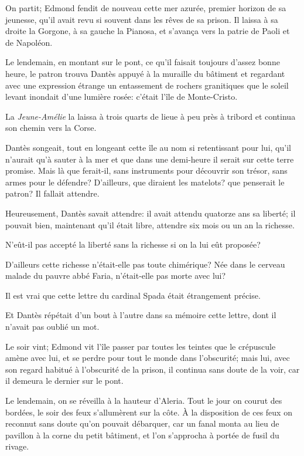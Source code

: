 On partit; Edmond fendit de nouveau cette mer azurée, premier horizon de sa jeunesse, qu'il avait revu si souvent dans les rêves de sa prison. Il laissa à sa droite la Gorgone, à sa gauche la Pianosa, et s'avança vers la patrie de Paoli et de Napoléon.

Le lendemain, en montant sur le pont, ce qu'il faisait toujours d'assez bonne heure, le patron trouva Dantès appuyé à la muraille du bâtiment et regardant avec une expression étrange un entassement de rochers granitiques que le soleil levant inondait d'une lumière rosée: c'était l'île de Monte-Cristo.

La \textit{Jeune-Amélie} la laissa à trois quarts de lieue à peu près à tribord et continua son chemin vers la Corse.

Dantès songeait, tout en longeant cette île au nom si retentissant pour lui, qu'il n'aurait qu'à sauter à la mer et que dans une demi-heure il serait sur cette terre promise. Mais là que ferait-il, sans instruments pour découvrir son trésor, sans armes pour le défendre? D'ailleurs, que diraient les matelots? que penserait le patron? Il fallait attendre.

Heureusement, Dantès savait attendre: il avait attendu quatorze ans sa liberté; il pouvait bien, maintenant qu'il était libre, attendre six mois ou un an la richesse.

N'eût-il pas accepté la liberté sans la richesse si on la lui eût proposée?

D'ailleurs cette richesse n'était-elle pas toute chimérique? Née dans le cerveau malade du pauvre abbé Faria, n'était-elle pas morte avec lui?

Il est vrai que cette lettre du cardinal Spada était étrangement précise.

Et Dantès répétait d'un bout à l'autre dans sa mémoire cette lettre, dont il n'avait pas oublié un mot.

Le soir vint; Edmond vit l'île passer par toutes les teintes que le crépuscule amène avec lui, et se perdre pour tout le monde dans l'obscurité; mais lui, avec son regard habitué à l'obscurité de la prison, il continua sans doute de la voir, car il demeura le dernier sur le pont.

Le lendemain, on se réveilla à la hauteur d'Aleria. Tout le jour on courut des bordées, le soir des feux s'allumèrent sur la côte. À la disposition de ces feux on reconnut sans doute qu'on pouvait débarquer, car un fanal monta au lieu de pavillon à la corne du petit bâtiment, et l'on s'approcha à portée de fusil du rivage.

